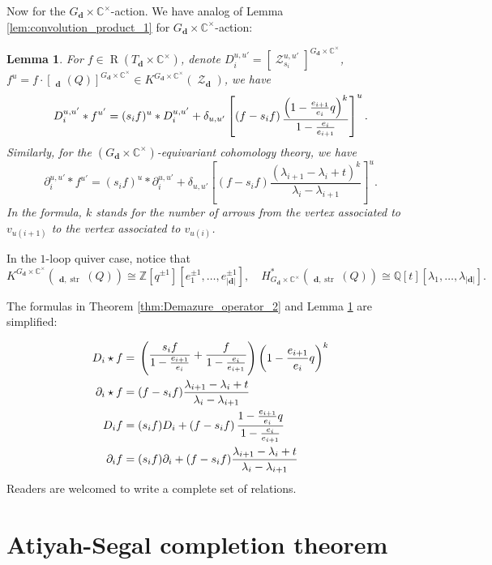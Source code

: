 \documentclass[reqno,11pt]{book}
\numberwithin{equation}{section}
\theoremstyle{plain}
\newtheorem{lemma}[theorem]{Lemma}
\theoremstyle{plain}
\numberwithin{equation}{section}
\theoremstyle{remark}
\DeclareMathOperator{\RRep}{\widetilde{\operatorname{Rep}}}
\DeclareMathOperator{\Rpt}{\operatorname{R}}
\DeclareMathOperator{\St}{\mathcal{Z}}
\DeclareMathOperator{\str}{\operatorname{str}}
\newcommand{\dimvec}[1]{\mathbf{#1}}
\newcommand{\abdimvec}[1]{|\dimvec{#1}|}
\newcommand{\fakestar}{*}
\begin{document}
Now for the $G_{\dimvec{d}} \times \mathbb{C}^{\times}$-action. We have analog of Lemma \ref{lem:convolution_product_1} for $G_{\dimvec{d}} \times \mathbb{C}^{\times}$-action:
\begin{lemma}\label{lem:convolution_product_2}
For $f \in \Rpt(T_{\dimvec{d}} \times \mathbb{C}^{\times})$, denote $D_i^{u,u'} =\left[\St_{s_{i}}^{u,u'}\right]^{G_{\dimvec{d}}\times \mathbb{C}^{\times}}$, $f^{u}=f \cdot \left[ \RRep_{\dimvec{d}}(Q) \right]^{G_{\dimvec{d}}\times \mathbb{C}^{\times}} \in K^{G_{\dimvec{d}}\times \mathbb{C}^{\times}} (\St_{\dimvec{d}})$, we have
$$D_i^{u,u'} \fakestar f^{u'}= (s_i f)^{u} \fakestar D_i^{u,u'} +  \delta_{u,u'}\left[\left(f-s_i f\right) \raisebox{-1mm}{$\displaystyle\frac{\left( 1-\frac{e_{i+1}}{e_{i}} q\right)^{k}}{ 1-\frac{e_{i}}{e_{i+1}}}$}\right]^{u}.$$
Similarly, for the $(G_{\dimvec{d}}\times \mathbb{C}^{\times})$-equivariant cohomology theory, we have
$$\partial_i^{u,u'} \fakestar f^{u'}= (s_i f)^{u} \fakestar \partial_i^{u,u'} +  \delta_{u,u'}\left[\left(f-s_i f\right) 
\frac{\left(\lambda_{i+1}-\lambda_{i}+t\right)^{k}}{\lambda_{i}-\lambda_{i+1}}   \right]^{u}.$$
In the formula, $k$ stands for the number of arrows from the vertex associated to $v_{u(i+1)}$ to the vertex associated to $v_{u(i)}$.
\end{lemma}
In the $1$-loop quiver case, notice that
$$K^{G_{\dimvec{d}} \times \mathbb{C}^{\times}} \left(\RRep_{\dimvec{d},\str}(Q)\right) \cong  \mathbb{Z}\left[q^{\pm 1}\right]\!\left[ e_1^{\pm 1},\ldots,e_{\abdimvec{d}}^{\pm 1} \right], \quad H_{G_{\dimvec{d}}\times \mathbb{C}^{\times}}^{*}\!\!\left(\RRep_{\dimvec{d},\str}(Q)\right) \cong  \mathbb{Q}[t]\left[\lambda_1,\ldots,\lambda_{\abdimvec{d}}\right].$$

The formulas in Theorem \ref{thm:Demazure_operator_2} and Lemma \ref{lem:convolution_product_2} are simplified:

\begin{equation*}
\begin{aligned}
  D_i \star f=\;&
  \left( \raisebox{1mm}{$\displaystyle\frac{s_i f}{ 1-\frac{e_{i+1}}{e_{i}}}     + \frac{f}{1-\frac{e_{i}}{e_{i+1}}}$}  \right)\left(\displaystyle 1-\frac{e_{i+1}}{e_{i}} q\right)^{k} \\
  \partial_i \star f =\;& (f -s_i f) \frac{\lambda_{i+1}-\lambda_{i}+t}{\lambda_{i}-\lambda_{i+1}}\\
  D_i f =\;& (s_i f) D_i + \left(f-s_i f\right) \displaystyle\frac{ 1-\frac{e_{i+1}}{e_{i}} q}{ 1-\frac{e_{i}}{e_{i+1}}}\\ 
  \partial_i f =\;& (s_i f) \partial_i + (f-s_i f) \frac{\lambda_{i+1}-\lambda_{i}+t}{\lambda_{i}-\lambda_{i+1}}\\   
\end{aligned}
\end{equation*}
Readers are welcomed to write a complete set of relations.
\section{Atiyah-Segal completion theorem}\label{sec:AScompletion}




\end{document}
